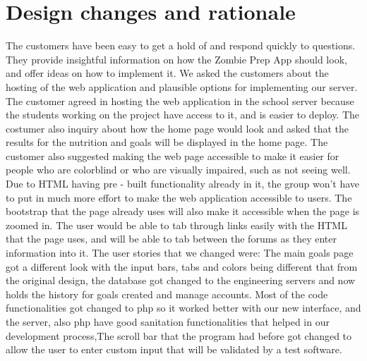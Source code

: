 \documentclass[a4paper]{article}
\begin{document}
\section{Design changes and rationale}
The customers have been easy to get a hold of and respond quickly to questions. They provide insightful information on how the Zombie Prep App should look, and offer ideas on how to implement it. 
\newline
\newline
We asked the customers about the hosting of the web application and  plausible options for  implementing our server. The customer agreed in hosting the web application in the school server because the students working on the project have access to it, and is easier to deploy. The costumer also inquiry about how the home page would look and asked that the results for the nutrition and goals will be displayed in the home page.
\newline
\newline
The customer also suggested making the web page accessible to make it easier for people who are colorblind or who are visually impaired, such as not seeing well. Due to HTML having pre - built functionality already in it, the group won't have to put in much more effort to make the web application accessible to users. 
\newline
\newline
The bootstrap that the page already uses will also make it accessible when the page is zoomed in. The user would be able to tab through links easily with the HTML that the page uses, and will be able to tab between the forums as they enter information into it. 
\newline
\newline
The user stories that we changed were:
\newline
\newline
The main goals page got a different look with the input bars, tabs and colors being different that from the original design, the database got changed to the engineering servers and now holds the history for goals created and manage accounts.
\newline
\newline
Most of the code functionalities got changed to php so it worked better with our new interface, and the server, also php have good sanitation functionalities that helped in our development process,The scroll bar that the program had before got changed to allow the user to enter custom input that will be validated by a test software.
\end{document}
